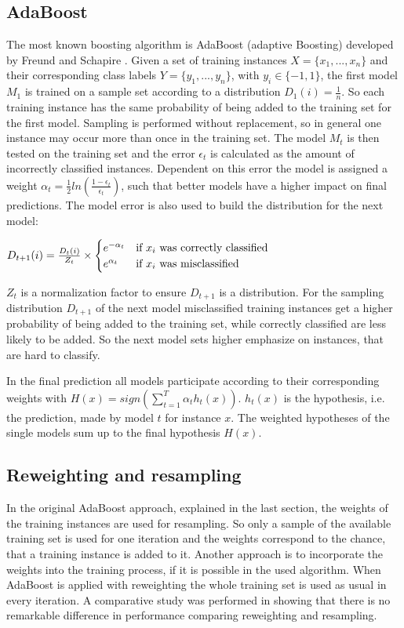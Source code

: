 \documentclass[10pt]{reportMaster}
\begin{document}
\subsection{AdaBoost}
\label{sec:adaBoost}
The most known boosting algorithm is AdaBoost (adaptive Boosting) developed by Freund and Schapire \cite{boostingIntro}.
Given a set of training instances $X = \{x_1, ..., x_n\}$ and their corresponding class labels $Y = \{y_1, ..., y_n\}$, with $y_i \in \{-1, 1\}$, the first model $M_1$ is trained on a sample set according to a distribution $D_1(i) = \frac{1}{n}$. So each training instance has the same probability of being added to the training set for the first model.
Sampling is performed without replacement, so in general one instance may occur more than once in the training set.
The model $M_t$ is then tested on the training set and the error $\epsilon_t$ is calculated as the amount of incorrectly classified instances.
Dependent on this error the model is assigned a weight $\alpha_t = \frac{1}{2} ln(\frac{1 - \epsilon_t}{\epsilon_t})$, such that better models have a higher impact on final predictions.
The model error is also used to build the distribution for the next model: 

$ D_{t+1}(i) = \frac{D_t(i)}{Z_t} \times 
\begin{cases}
	e^{-\alpha_t} & \text{if $ x_i $ was correctly classified} \\ 
	e^{\alpha_t} & \text{if $ x_i $ was misclassified}
\end{cases}
$

$Z_t$ is a normalization factor to ensure $D_{t+1}$ is a distribution.
For the sampling distribution $D_{t+1}$ of the next model misclassified training instances get a higher probability of being added to the training set, while correctly classified are less likely to be added.
So the next model sets higher emphasize on instances, that are hard to classify.

In the final prediction all models participate according to their corresponding weights with $H(x) = sign(\sum_{t = 1}^T\alpha_th_t(x))$.
$h_t(x)$ is the hypothesis, i.e. the prediction, made by model $t$ for instance $x$.
The weighted hypotheses of the single models sum up to the final hypothesis $H(x)$. 


\subsection{Reweighting and resampling}
\label{sec:reweightingResampling}
In the original AdaBoost approach, explained in the last section, the weights of the training instances are used for resampling.
So only a sample of the available training set is used for one iteration and the weights correspond to the chance, that a training instance is added to it.
Another approach is to incorporate the weights into the training process, if it is possible in the used algorithm.
When AdaBoost is applied with reweighting the whole training set is used as usual in every iteration.
A comparative study was performed in \cite{resamplingReweighting} showing that there is no remarkable difference in performance comparing reweighting and resampling.
\end{document}
